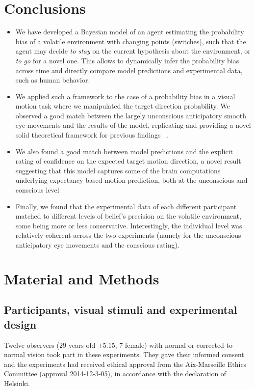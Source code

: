 \documentclass[12pt,english]{article}%
\newcommand{\citep}[1]{\parencite{#1}}
\begin{document}
\section{Conclusions}
\begin{itemize}\setlength{\itemsep}{0ex}
\item We have developed a Bayesian model of an agent estimating the probability bias of a volatile environment with changing points (switches), such that the agent may decide \textit{to stay} on the current hypothesis about the environment, or \textit{to go} for a novel one. This allows to dynamically infer the probability bias across time and directly compare model predictions and experimental data, such as human behavior.
\item We applied such a framework to the case of a probability bias in a visual motion task where we manipulated the target direction probability. We observed a good match between the largely unconscious anticipatory smooth eye movements and the results of the model, replicating and providing a novel solid theoretical framework for previous findings ~\citep{Montagnini2010, SantosKowler2017, Damasse18}.
\item We also found a good match between model predictions and the explicit rating of confidence on the expected target motion direction, a novel result suggesting that this model captures some of the brain computations underlying expectancy based motion prediction, both at the unconscious and conscious level
\item Finally, we found that the experimental data of each different participant matched to different levels of belief's precision on the volatile environment, some being more or less conservative. Interestingly, the individual level was relatively coherent across the two experiments (namely for the unconscious anticipatory eye movements and the conscious rating).
\end{itemize}
\section{Material and Methods}
\subsection{Participants, visual stimuli and experimental design}
Twelve observers ($29$ years old $\pm 5.15$, $7$ female) with normal or corrected-to-normal vision took part in these experiments. They gave their informed consent and the experiments had received ethical approval from the Aix-Marseille Ethics Committee (approval 2014-12-3-05), in accordance with the declaration of Helsinki.
\end{document}
